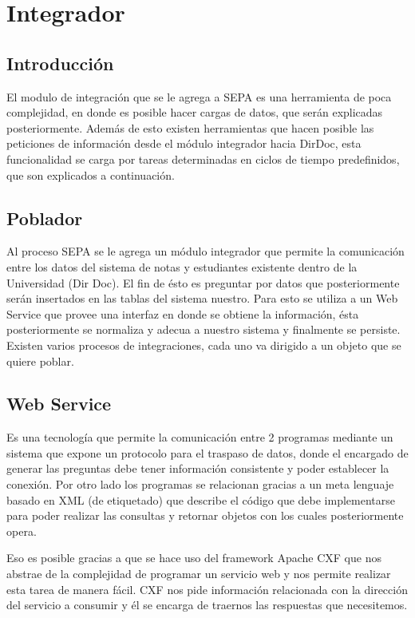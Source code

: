 \documentclass[a4paper,12pt,openany,oneside]{book}
\begin{document}
\chapter{Integrador}
\thispagestyle{empty}
\section{Introducción}

El modulo de integración que se le agrega a SEPA es una herramienta de poca complejidad, en donde es posible hacer cargas de datos, que serán explicadas posteriormente. Además de esto existen herramientas que hacen posible las peticiones de información desde el módulo integrador hacia DirDoc, esta funcionalidad se carga por tareas determinadas en ciclos de tiempo predefinidos, que son explicados a continuación.

\section{Poblador}
Al proceso SEPA se le agrega un módulo integrador que permite la comunicación entre los datos del sistema de notas y estudiantes existente dentro de la Universidad (Dir Doc). El fin de ésto es preguntar por datos que posteriormente serán insertados en las tablas del sistema nuestro. Para esto se utiliza a un Web Service que provee una interfaz en donde se obtiene la información, ésta posteriormente se normaliza y adecua a nuestro sistema y finalmente se persiste. Existen varios procesos de integraciones, cada uno va dirigido a un objeto que se quiere poblar.
\section{Web Service}
Es una tecnología que permite la comunicación entre 2 programas mediante un sistema que expone un protocolo para el traspaso de datos, donde el encargado de generar las preguntas debe tener información consistente y poder establecer la conexión. Por otro lado los programas se relacionan gracias a un meta lenguaje basado en XML (de etiquetado) que describe el código que debe implementarse para poder realizar las consultas y retornar objetos con los cuales posteriormente opera.

Eso es posible gracias a que se hace uso del framework Apache CXF que nos abstrae de la complejidad de programar un servicio web y nos permite realizar esta tarea de manera fácil. CXF nos pide información relacionada con la dirección del servicio a consumir y él se encarga de traernos las respuestas que necesitemos.
\end{document}
